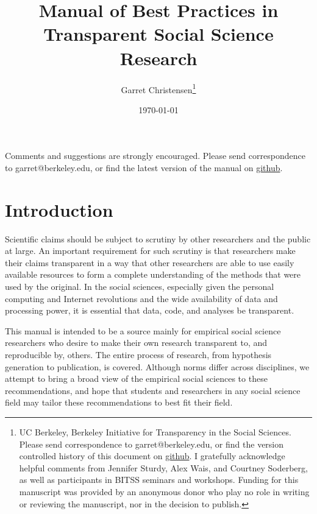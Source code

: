 \documentclass[12pt] {article}
\begin{document}
\title{Manual of Best Practices in Transparent Social Science Research}

\author{Garret Christensen\footnote{UC Berkeley, Berkeley Initiative for Transparency in the Social Sciences. Please send correspondence to garret@berkeley.edu, or find the version controlled history of this document on \href{https://github.com/garretchristensen/BestPracticesManual}{github}. I gratefully acknowledge helpful comments from Jennifer Sturdy, Alex Wais, and Courtney Soderberg, as well as participants in BITSS seminars and workshops. Funding for this manuscript was provided by an anonymous donor who play no role in writing or reviewing the manuscript, nor in the decision to publish.}}
\date{\today}
\maketitle

\begin{center}
Comments and suggestions are strongly encouraged. Please send correspondence to garret@berkeley.edu, or find the latest version of the manual on \href{https://github.com/garretchristensen/BestPracticesManual}{github}.
\end{center}

\newpage
\tableofcontents

\newpage
\section{Introduction}\label{introduction}

Scientific claims should be subject to scrutiny by other researchers and
the public at large. An important requirement for such scrutiny is that
researchers make their claims transparent in a way that other
researchers are able to use easily available resources to form a
complete understanding of the methods that were used by the original. In
the social sciences, especially given the personal computing and
Internet revolutions and the wide availability of data and processing
power, it is essential that data, code, and analyses be transparent.

This manual is intended to be a source mainly for empirical social
science researchers who desire to make their own research transparent
to, and reproducible by, others. The entire process of research, from
hypothesis generation to publication, is covered. Although norms differ
across disciplines, we attempt to bring a broad view of the empirical
social sciences to these recommendations, and hope that students and
researchers in any social science field may tailor these recommendations
to best fit their field.
\end{document}
